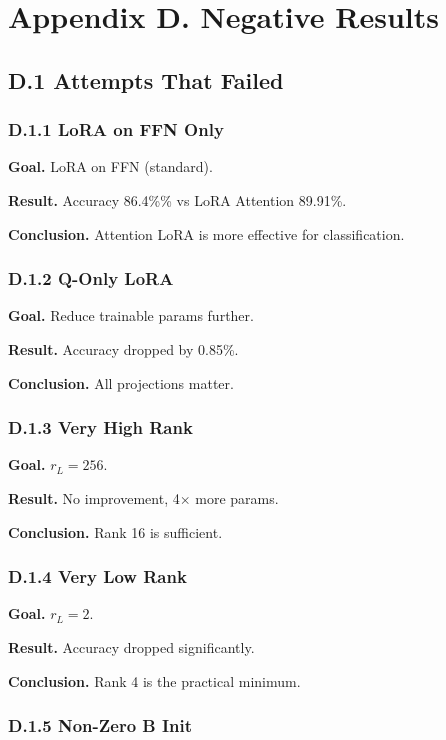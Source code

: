 \section{Appendix D. Negative Results}

\subsection{D.1 Attempts That Failed}

\subsubsection{D.1.1 LoRA on FFN Only}

\textbf{Goal.} LoRA on FFN (standard).

\textbf{Result.} Accuracy 86.4\%\% vs LoRA Attention 89.91\%.

\textbf{Conclusion.} Attention LoRA is more effective for classification.

\subsubsection{D.1.2 Q-Only LoRA}

\textbf{Goal.} Reduce trainable params further.

\textbf{Result.} Accuracy dropped by 0.85\%.

\textbf{Conclusion.} All projections matter.

\subsubsection{D.1.3 Very High Rank}

\textbf{Goal.} $r_L = 256$.

\textbf{Result.} No improvement, 4$\times$ more params.

\textbf{Conclusion.} Rank 16 is sufficient.

\subsubsection{D.1.4 Very Low Rank}

\textbf{Goal.} $r_L = 2$.

\textbf{Result.} Accuracy dropped significantly.

\textbf{Conclusion.} Rank 4 is the practical minimum.

\subsubsection{D.1.5 Non-Zero B Init}


